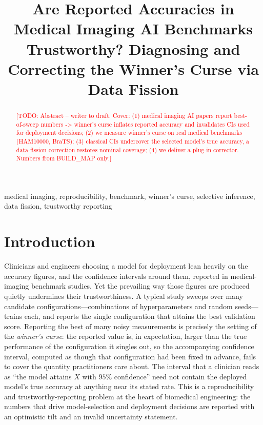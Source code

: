 \documentclass[conference]{IEEEtran}
\newcommand{\todo}[1]{\textcolor{red}{[TODO: #1]}}
\begin{document}
\title{Are Reported Accuracies in Medical Imaging AI Benchmarks Trustworthy? Diagnosing and Correcting the Winner's Curse via Data Fission}

\author{\IEEEauthorblockA{\todo{author block / affiliation -- fill at camera-ready, keep anonymous if double-blind required}}}

\maketitle

\begin{abstract}
\todo{Abstract -- writer to draft. Cover: (1) medical imaging AI papers report best-of-sweep numbers -> winner's curse inflates reported accuracy and invalidates CIs used for deployment decisions; (2) we measure winner's curse on real medical benchmarks (HAM10000, BraTS); (3) classical CIs undercover the selected model's true accuracy, a data-fission correction restores nominal coverage; (4) we deliver a plug-in corrector. Numbers from BUILD\_MAP only.}
\end{abstract}

\begin{IEEEkeywords}
medical imaging, reproducibility, benchmark, winner's curse, selective inference, data fission, trustworthy reporting
\end{IEEEkeywords}

\section{Introduction}
Clinicians and engineers choosing a model for deployment lean heavily on the
accuracy figures, and the confidence intervals around them, reported in
medical-imaging benchmark studies. Yet the prevailing way those figures are
produced quietly undermines their trustworthiness. A typical study sweeps over
many candidate configurations---combinations of hyperparameters and random
seeds---trains each, and reports the single configuration that attains the best
validation score. Reporting the best of many noisy measurements is precisely the
setting of the \emph{winner's curse}: the reported value is, in expectation,
larger than the true performance of the configuration it singles out, so the
accompanying confidence interval, computed as though that configuration had been
fixed in advance, fails to cover the quantity practitioners care about. The
interval that a clinician reads as ``the model attains $X$ with $95\%$
confidence'' need not contain the deployed model's true accuracy at anything
near its stated rate. This is a reproducibility and trustworthy-reporting
problem at the heart of biomedical engineering: the numbers that drive
model-selection and deployment decisions are reported with an optimistic tilt
and an invalid uncertainty statement.
\end{document}
